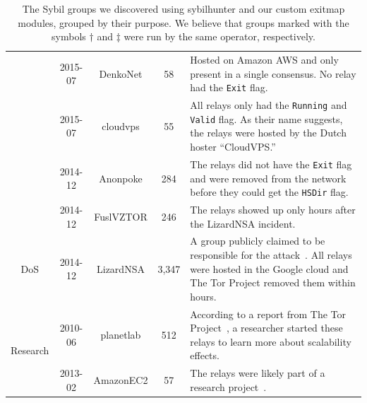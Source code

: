 \begin{table}[t]
\begin{tabularx}{\textwidth}{c|c c c X}
& 2015-07 & DenkoNet & 58 & Hosted on Amazon AWS and only present in a single
consensus.  No relay had the \texttt{Exit} flag. \\

& 2015-07 & cloudvps & 55 & All relays only had the \texttt{Running} and
\texttt{Valid} flag.  As their name suggests, the relays were hosted by the
Dutch hoster ``CloudVPS.'' \\

& 2014-12 & Anonpoke & 284 & The relays did not have the \texttt{Exit} flag
and were removed from the network before they could get the \texttt{HSDir} flag.
\\

& 2014-12 & FuslVZTOR & 246 & The relays showed up only hours after the
LizardNSA incident. \\

\hline

\multirow{1}{*}{DoS}
& 2014-12 & LizardNSA & 3,347 & A group publicly claimed to be responsible
for the attack~\cite{lizards}.  All relays were hosted in the Google cloud and
The Tor Project removed them within hours. \\

\hline

\multirow{2}{*}{Research}
& 2010-06 & planetlab & 512 & According to a report from The Tor
Project~\cite{progressreport}, a researcher started these relays to learn more
about scalability effects. \\

& 2013-02 & AmazonEC2 & 57 & The relays were likely part of a research
project~\cite{Biryukov2013a}. \\

\end{tabularx}
\caption{The Sybil groups we discovered using sybilhunter and our custom exitmap
modules, grouped by their purpose.  We believe that groups marked with the
symbols $\dagger$ and $\ddagger$ were run by the same operator, respectively.}
\label{tab:sybils}
\end{table}

